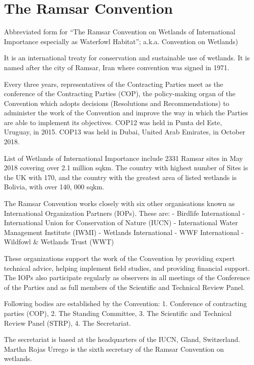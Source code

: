 \documentclass[
]{book}
\begin{document}
\hypertarget{the-ramsar-convention}{%
\section{The Ramsar Convention}\label{the-ramsar-convention}}

Abbreviated form for ``The Ramsar Convention on Wetlands of International Importance especially as Waterfowl Habitat''; a.k.a. Convention on Wetlands)

It is an international treaty for conservation and sustainable use of wetlands. It is named after the city of Ramsar, Iran where convention was signed in 1971.

Every three years, representatives of the Contracting Parties meet as the conference of the Contracting Parties (COP), the policy-making organ of the Convention which adopts decisions (Resolutions and Recommendations) to administer the work of the Convention and improve the way in which the Parties are able to implement its objectives. COP12 was held in Punta del Este, Uruguay, in 2015. COP13 was held in Dubai, United Arab Emirates, in October 2018.

List of Wetlands of International Importance include 2331 Ramsar sites in May 2018 covering over 2.1 million sqkm. The country with highest number of Sites is the UK with 170, and the country with the greatest area of listed wetlands is Bolivia, with over 140, 000 sqkm.

The Ramsar Convention works closely with six other organisations known as International Organization Partners (IOPs). These are:
- Birdlife International
- International Union for Conservation of Nature (IUCN)
- International Water Management Institute (IWMI)
- Wetlands International
- WWF International
- Wildfowl \& Wetlands Trust (WWT)

These organizations support the work of the Convention by providing expert technical advice, helping implement field studies, and providing financial support. The IOPs also participate regularly as observers in all meetings of the Conference of the Parties and as full members of the Scientific and Technical Review Panel.

Following bodies are established by the Convention: 1. Conference of contracting parties (COP), 2. The Standing Committee, 3. The Scientific and Technical Review Panel (STRP), 4. The Secretariat.

The secretariat is based at the headquarters of the IUCN, Gland, Switzerland. Martha Rojas Urrego is the sixth secretary of the Ramsar Convention on wetlands.
\end{document}
